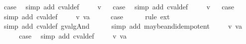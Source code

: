 \begin{isabellebody}
\ {\isacharquery}case\ \isamarkupfalse%
\ {\isacharparenleft}simp\ add{\isacharcolon}\ cval{\isacharunderscore}def{\isacharparenright}\isanewline
{}\isamarkupfalse%
\isanewline
\ \ \isamarkupfalse%
\ {\isacharparenleft}{\isachardoublequoteopen}{}{\isacharunderscore}{}{}{\isachardoublequoteclose}\ v{\isacharparenright}\isanewline
{}\isamarkupfalse%
\ \isamarkupfalse%
\ {\isacharquery}case\ \isamarkupfalse%
\ {\isacharparenleft}simp\ add{\isacharcolon}\ cval{\isacharunderscore}def{\isacharparenright}\isanewline
{}\isamarkupfalse%
\isanewline
\ \ \isamarkupfalse%
\ {\isacharparenleft}{\isachardoublequoteopen}{}{\isacharunderscore}{}{}{\isachardoublequoteclose}\ v{\isacharparenright}\isanewline
{}\isamarkupfalse%
\ \isamarkupfalse%
\ {\isacharquery}case\ \isamarkupfalse%
\ {\isacharparenleft}simp\ add{\isacharcolon}\ cval{\isacharunderscore}def{\isacharparenright}\isanewline
{}\isamarkupfalse%
\isanewline
\ \ \isamarkupfalse%
\ {\isacharparenleft}{\isachardoublequoteopen}{}{\isacharunderscore}{}{}{\isachardoublequoteclose}\ v\ va{\isacharparenright}\isanewline
\ \ \isamarkupfalse%
\ \isamarkupfalse%
\ {\isacharquery}case\isanewline
\ \ \ \ \isamarkupfalse%
\ {\isacharparenleft}rule\ ext{\isacharparenright}{\isacharplus}\isanewline
\ \ \ \ \isamarkupfalse%
\ {\isacharparenleft}simp\ add{\isacharcolon}\ cval{\isacharunderscore}def\ gval{\isacharunderscore}gAnd{\isacharparenright}\isanewline
\ \ \ \ \isamarkupfalse%
\ {\isacharparenleft}simp\ add{\isacharcolon}\ maybe{\isacharunderscore}and{\isacharunderscore}idempotent{\isacharparenright}\isanewline
{}\isamarkupfalse%
\isanewline
\ \ \isamarkupfalse%
\ {\isacharparenleft}{\isachardoublequoteopen}{}{\isacharunderscore}{}{}{\isachardoublequoteclose}\ v\ va{\isacharparenright}\isanewline
\ \ \isamarkupfalse%
\ \isamarkupfalse%
\ {\isacharquery}case\ \isamarkupfalse%
\ {\isacharparenleft}simp\ add{\isacharcolon}\ cval{\isacharunderscore}def{\isacharparenright}\isanewline
{}\isamarkupfalse%
\isanewline
\ \ \isamarkupfalse%
\ {\isacharparenleft}{\isachardoublequoteopen}{}{\isacharunderscore}{}{}{\isachardoublequoteclose}\ v\ va{\isacharparenright}\isanewline

\end{isabellebody}
